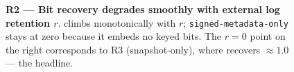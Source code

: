 \begin{figure}[t]
\centering
{}
\caption{\textbf{R2 — Bit recovery degrades smoothly with external
log retention $r$}. \memmark{} climbs monotonically with $r$;
\texttt{signed-metadata-only} stays at zero because it embeds no
keyed bits. The $r{=}0$ point on the right corresponds to R3
(snapshot-only), where \memmark{} recovers $\approx 1.0$ — the
headline.}
\label{fig:r2-curve}
\end{figure}
